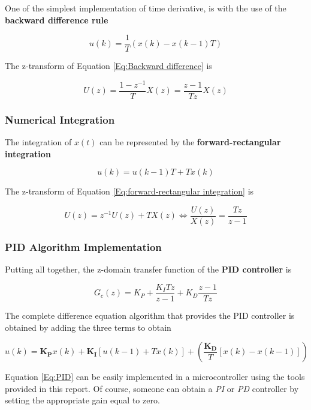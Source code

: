 One of the simplest implementation of time derivative, is with the use of the \textbf{backward difference rule}

\begin{equation}
	u(k) = \frac{1}{T} \left(x(k) - x(k-1)T \right)
	\label{Eq:Backward difference}
\end{equation}

\noindent The z-transform of Equation \ref{Eq:Backward difference} is

\begin{equation}
	U(z) = \frac{1-z^{-1}}{T} X(z) = \frac{z-1}{Tz} X(z)
	\label{Eq:z-Backward difference}
\end{equation}


\subsubsection{Numerical Integration}

The integration of $x(t)$ can be represented by the \textbf{forward-rectangular integration}

\begin{equation}
	u(k) = u(k-1)T + Tx(k)
	\label{Eq:forward-rectangular integration}
\end{equation}

\noindent The z-transform of Equation \ref{Eq:forward-rectangular integration} is

\begin{equation}
	U(z) = z^{-1} U(z) + T X(z) \Leftrightarrow \frac{U(z)}{X(z)} = \frac{Tz}{z-1}
	\label{Eq:z-forward-rectangular integration}
\end{equation}


\subsubsection{PID Algorithm Implementation}

Putting all together, the z-domain transfer function of the \textbf{PID controller} is

\begin{equation}
	G_c(z) = K_P + \frac{K_I T z}{z-1} + K_D \frac{z-1}{Tz}
	\label{Eq:PID_z}
\end{equation}

The complete difference equation algorithm that provides the PID controller is obtained by adding the three terms to obtain

\begin{equation}
	u(k) = \boldsymbol{K_P} x(k) + \boldsymbol{K_I} \left[ u(k-1) + T x(k) \right] + \left(\frac{\boldsymbol{K_D}}{T} \left[ x(k) - x(k-1) \right]\right)
	\label{Eq:PID}
\end{equation}

\noindent Equation \ref{Eq:PID} can be easily implemented in a microcontroller using the tools provided in this report. Of course, someone can obtain a \textit{PI} or \textit{PD} controller by setting the appropriate gain equal to zero.

